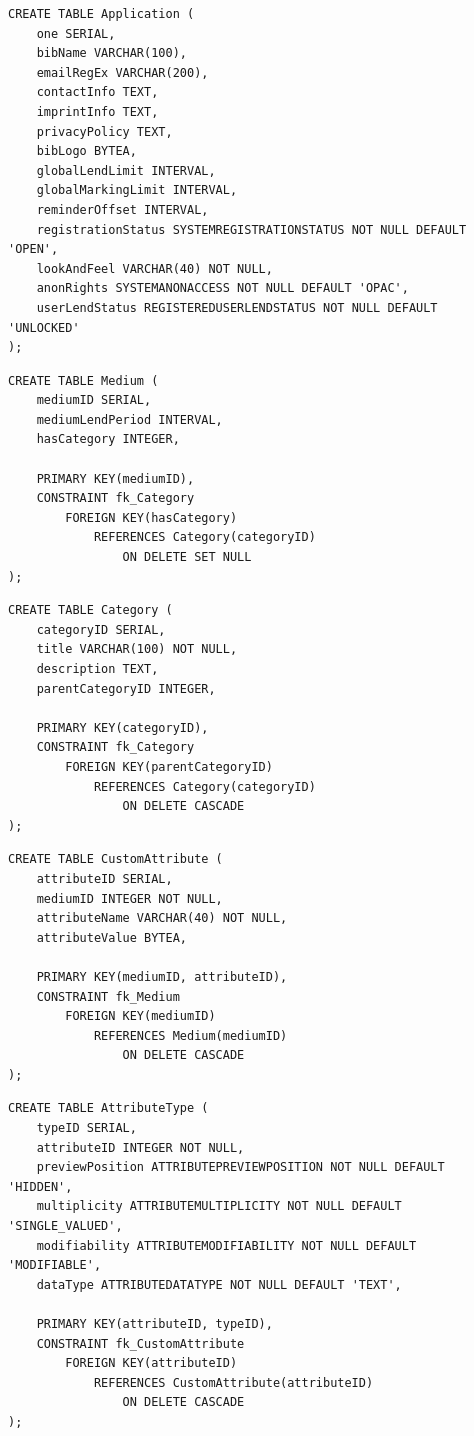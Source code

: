 \documentclass{article}
\begin{document}
\hypertarget{Application}{}
\begin{lstlisting}
CREATE TABLE Application (
	one SERIAL,
	bibName VARCHAR(100),
	emailRegEx VARCHAR(200),
	contactInfo TEXT,
	imprintInfo TEXT,
	privacyPolicy TEXT,
	bibLogo BYTEA,
	globalLendLimit INTERVAL,
	globalMarkingLimit INTERVAL,
	reminderOffset INTERVAL,	
	registrationStatus SYSTEMREGISTRATIONSTATUS NOT NULL DEFAULT 'OPEN',
	lookAndFeel VARCHAR(40) NOT NULL,
	anonRights SYSTEMANONACCESS NOT NULL DEFAULT 'OPAC',
	userLendStatus REGISTEREDUSERLENDSTATUS NOT NULL DEFAULT 'UNLOCKED'	
);
\end{lstlisting}
\hypertarget{Medium}{}
\begin{lstlisting}
CREATE TABLE Medium ( 
	mediumID SERIAL,
	mediumLendPeriod INTERVAL,
	hasCategory INTEGER,
	
	PRIMARY KEY(mediumID),
	CONSTRAINT fk_Category 
		FOREIGN KEY(hasCategory) 
			REFERENCES Category(categoryID) 
				ON DELETE SET NULL
);
\end{lstlisting} 
\hypertarget{Category}{}
\begin{lstlisting}
CREATE TABLE Category (
	categoryID SERIAL,
	title VARCHAR(100) NOT NULL,
	description TEXT,
	parentCategoryID INTEGER,
	
	PRIMARY KEY(categoryID),
	CONSTRAINT fk_Category
		FOREIGN KEY(parentCategoryID)
			REFERENCES Category(categoryID) 
				ON DELETE CASCADE
);
\end{lstlisting} 
\hypertarget{CustomAttribute}{}
\begin{lstlisting}
CREATE TABLE CustomAttribute (
	attributeID SERIAL,
	mediumID INTEGER NOT NULL,
	attributeName VARCHAR(40) NOT NULL,
	attributeValue BYTEA,
	
	PRIMARY KEY(mediumID, attributeID),
	CONSTRAINT fk_Medium 
		FOREIGN KEY(mediumID) 
			REFERENCES Medium(mediumID) 
				ON DELETE CASCADE
);
\end{lstlisting} 
\hypertarget{AttributeType}{}
\begin{lstlisting}
CREATE TABLE AttributeType (
	typeID SERIAL,
	attributeID INTEGER NOT NULL,
	previewPosition ATTRIBUTEPREVIEWPOSITION NOT NULL DEFAULT 'HIDDEN',
	multiplicity ATTRIBUTEMULTIPLICITY NOT NULL DEFAULT 'SINGLE_VALUED',
	modifiability ATTRIBUTEMODIFIABILITY NOT NULL DEFAULT 'MODIFIABLE',
	dataType ATTRIBUTEDATATYPE NOT NULL DEFAULT 'TEXT',
	
	PRIMARY KEY(attributeID, typeID),
	CONSTRAINT fk_CustomAttribute 
		FOREIGN KEY(attributeID) 
			REFERENCES CustomAttribute(attributeID) 
				ON DELETE CASCADE
);
\end{lstlisting}
\end{document}
